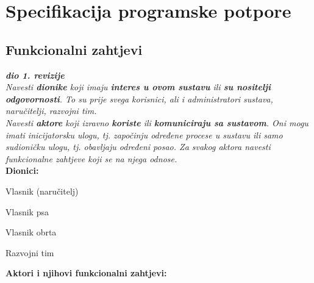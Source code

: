 \chapter{Specifikacija programske potpore}
		
	\section{Funkcionalni zahtjevi}
			
			\textbf{\textit{dio 1. revizije}}\\
			
			\textit{Navesti \textbf{dionike} koji imaju \textbf{interes u ovom sustavu} ili  \textbf{su nositelji odgovornosti}. To su prije svega korisnici, ali i administratori sustava, naručitelji, razvojni tim.}\\
				
			\textit{Navesti \textbf{aktore} koji izravno \textbf{koriste} ili \textbf{komuniciraju sa sustavom}. Oni mogu imati inicijatorsku ulogu, tj. započinju određene procese u sustavu ili samo sudioničku ulogu, tj. obavljaju određeni posao. Za svakog aktora navesti funkcionalne zahtjeve koji se na njega odnose.}\\
			
			
			\noindent \textbf{Dionici:}
			
			\begin{packed_enum}
				
				\item Vlasnik (naručitelj)
				\item Vlasnik psa
				\item Vlasnik obrta
				\item Razvojni tim
				
			\end{packed_enum}
			
			\noindent \textbf{Aktori i njihovi funkcionalni zahtjevi:}
			
